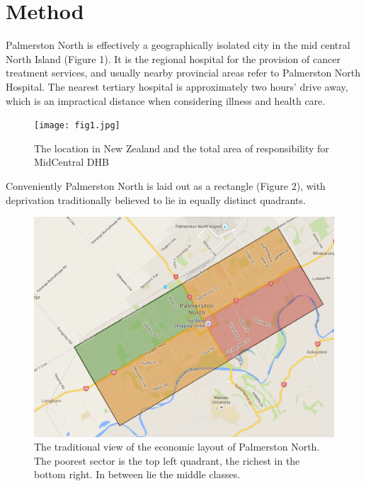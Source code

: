 \documentclass[11pt,a4paper]{article}
\begin{document}
\pagebreak
\section{Method}
Palmerston North is effectively a geographically isolated city in the mid central North Island (Figure 1). It is the regional hospital for the provision of cancer treatment services, and usually nearby provincial areas refer to Palmerston North Hospital. The nearest tertiary hospital is approximately two  hours’ drive away, which is an impractical distance when considering illness and health care.\\


\begin{figure}[htp]
\centering
\texttt{[image: fig1.jpg]}
\caption{The location in New Zealand and the total area of responsibility for MidCentral DHB}
\label{MidCentral District Health Board}
\end{figure}


Conveniently Palmerston North is laid out as a rectangle (Figure 2), with deprivation traditionally believed to lie in equally distinct quadrants.\\


\begin{figure}[htp]
\centering
\includegraphics[scale=0.20]{fig2.png}
\caption{The traditional view of the economic layout of Palmerston North. The poorest sector is the top left quadrant, the richest in the bottom right. In between lie the middle classes.}
\label{Traditional view of the spatial economics of Palmerston North City}
\end{figure}
\end{document}
